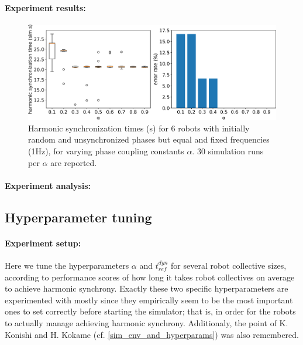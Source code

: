 		\paragraph{Experiment results:\nl}
		
		\begin{figure}[ht!]
			\centering
			\includegraphics[width=\linewidth]{Assets/DocSegments/Chapters/ExperimentsAndResults/Figures/PerfScores/baseline_reproducing_phase_sync_for_alpha.pdf}
			\caption[Experiment results for $\phi$ synchronization baseline reproduction experiment.]{Harmonic synchronization times (s) for 6 robots with initially random and unsynchronized phases but equal and fixed frequencies (1Hz), for varying phase coupling constants $\alpha$. 30 simulation runs per $\alpha$ are reported.}
			\label{fig:baseline_reproducing_phase_sync_for_alpha}
		\end{figure}
		
		\paragraph{Experiment analysis:\nl}
	
	\subsection{Hyperparameter tuning}
	
		\paragraph{Experiment setup:\nl}
		
		Here we tune the hyperparameters $\alpha$ and $t_{ref}^{dyn}$ for several robot collective sizes, according to performance scores of how long it takes robot collectives on average to achieve harmonic synchrony. Exactly these two specific hyperparameters are experimented with mostly since they empirically seem to be the most important ones to set correctly before starting the simulator; that is, in order for the robots to actually manage achieving harmonic synchrony. Additionaly, the point of K. Konishi and H. Kokame (cf. \ref{sim_env_and_hyperparams}) was also remembered.
		
